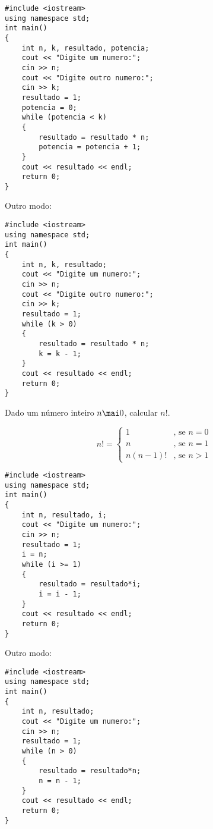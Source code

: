 \documentclass[a4paper]{memoir}
\begin{document}
\begin{sol}
\begin{lstlisting}
#include <iostream>
using namespace std;
int main()
{
    int n, k, resultado, potencia;
    cout << "Digite um numero:";
    cin >> n;
    cout << "Digite outro numero:";
    cin >> k;
    resultado = 1;
    potencia = 0;
    while (potencia < k)
    {
        resultado = resultado * n;
        potencia = potencia + 1;
    }
    cout << resultado << endl;
    return 0;
}
\end{lstlisting}

Outro modo:

\begin{lstlisting}
#include <iostream>
using namespace std;
int main()
{
    int n, k, resultado;
    cout << "Digite um numero:";
    cin >> n;
    cout << "Digite outro numero:";
    cin >> k;
    resultado = 1;
    while (k > 0)
    {
        resultado = resultado * n;
        k = k - 1;
    }
    cout << resultado << endl;
    return 0;
}
\end{lstlisting}

\end{sol}

\newpage

\begin{prob}\label{prob103.cpp}
Dado um número inteiro $n \mai 0$, calcular $n!$.

\begin{equation*}
  n! =
  \begin{cases}
    1 		& \mbox{, se } n = 0 \\
    n 		& \mbox{, se } n = 1 \\
    n(n - 1)! 	& \mbox{, se } n > 1
  \end{cases}
\end{equation*}
\end{prob}

\begin{sol}
\begin{lstlisting}
#include <iostream>
using namespace std;
int main()
{
    int n, resultado, i;
    cout << "Digite um numero:";
    cin >> n;
    resultado = 1;
    i = n;
    while (i >= 1)
    {
        resultado = resultado*i;
        i = i - 1;
    }
    cout << resultado << endl;
    return 0;
}
\end{lstlisting}

Outro modo:

\begin{lstlisting}
#include <iostream>
using namespace std;
int main()
{
    int n, resultado;
    cout << "Digite um numero:";
    cin >> n;
    resultado = 1;
    while (n > 0)
    {
        resultado = resultado*n;
        n = n - 1;
    }
    cout << resultado << endl;
    return 0;
}
\end{lstlisting}

\end{sol}
\end{document}
